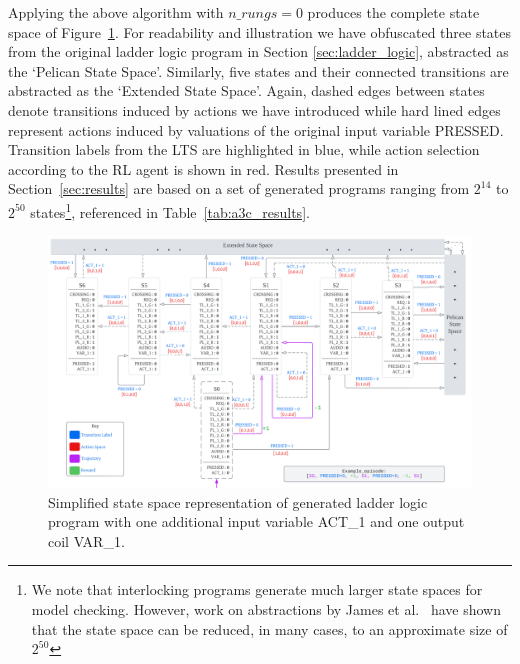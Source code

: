\documentclass[runningheads]{llncs}
\begin{document}
Applying the above algorithm with $n\_rungs=0$ produces the complete state space of Figure~\ref{fig:state_space}. For readability and illustration we have obfuscated three states from the original ladder logic program in Section \ref{sec:ladder_logic}, abstracted as the `Pelican State Space'. Similarly, five states and their connected transitions are abstracted as the `Extended State Space'.  Again, dashed edges between states denote transitions induced by actions we have introduced while hard lined edges represent actions induced by valuations of the original input variable PRESSED. Transition labels from the LTS are highlighted in blue, while action selection according to the RL agent is shown in red. Results presented in Section~\ref{sec:results} are based on a set of generated programs ranging from $2^{14}$ to $2^{50}$ states\footnote{We note that interlocking programs generate much larger state spaces for model checking. However, work on abstractions by James et al.~\cite{james2011automatically} have shown that the state space can be reduced, in many cases, to an approximate size of $2^{50}$}, referenced in Table~\ref{tab:a3c_results}.


\begin{figure}[!t]
	\centering
	\includegraphics[width=\linewidth]{figs/pelican_states.png}
	\caption{Simplified state space representation of generated ladder logic program with one additional input variable ACT\_1 and one output coil VAR\_1.}
	\label{fig:state_space}
\end{figure}
\end{document}
